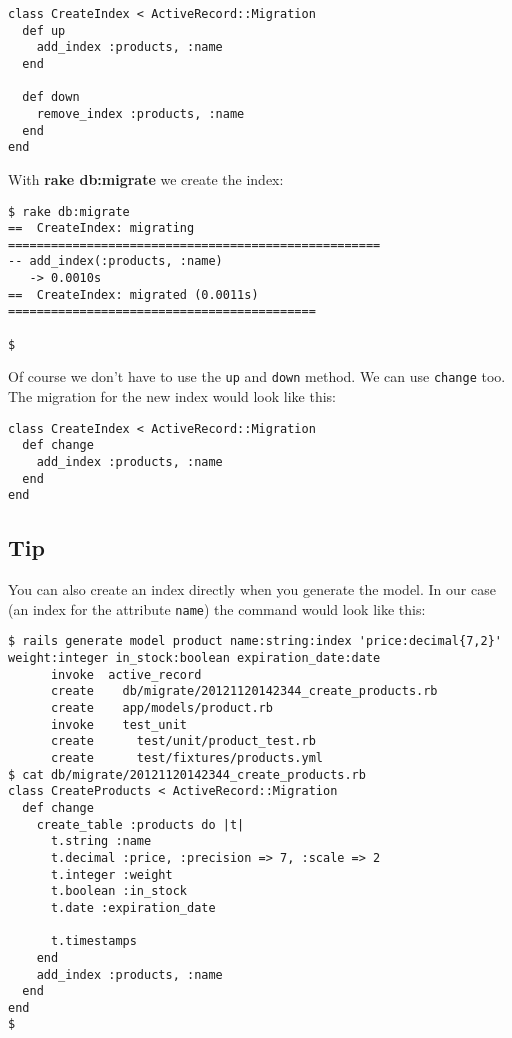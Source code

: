 \documentclass[a4paper]{book}
\newcounter{tab}[chapter]
\begin{document}
\begin{shaded}\begin{verbatim}
class CreateIndex < ActiveRecord::Migration
  def up
    add_index :products, :name
  end

  def down
    remove_index :products, :name
  end
end
\end{verbatim}\end{shaded}

With \textbf{rake db:migrate} we create the index:

\begin{shaded}\begin{verbatim}
$ rake db:migrate
==  CreateIndex: migrating ====================================================
-- add_index(:products, :name)
   -> 0.0010s
==  CreateIndex: migrated (0.0011s) ===========================================

$
\end{verbatim}\end{shaded}

Of course we don't have to use the \texttt{up} and \texttt{down} method. We can use \texttt{change} too. The migration for the new index would look like this:

\begin{shaded}\begin{verbatim}
class CreateIndex < ActiveRecord::Migration
  def change
    add_index :products, :name
  end
end
\end{verbatim}\end{shaded}

\subsection{Tip}\label{tip-13}

You can also create an index directly when you generate the model. In our case (an index for the attribute \texttt{name}) the command would look like this:

\begin{shaded}\begin{verbatim}
$ rails generate model product name:string:index 'price:decimal{7,2}' weight:integer in_stock:boolean expiration_date:date
      invoke  active_record
      create    db/migrate/20121120142344_create_products.rb
      create    app/models/product.rb
      invoke    test_unit
      create      test/unit/product_test.rb
      create      test/fixtures/products.yml
$ cat db/migrate/20121120142344_create_products.rb
class CreateProducts < ActiveRecord::Migration
  def change
    create_table :products do |t|
      t.string :name
      t.decimal :price, :precision => 7, :scale => 2
      t.integer :weight
      t.boolean :in_stock
      t.date :expiration_date

      t.timestamps
    end
    add_index :products, :name
  end
end
$
\end{verbatim}\end{shaded}
\end{document}
